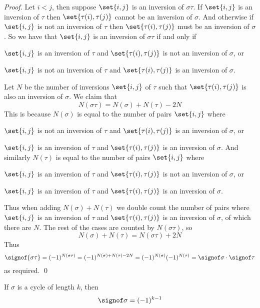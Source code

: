 \begin{proof}

    Let $i<j$, then suppose $\set{i,j}$ is an inversion of $\sigma\tau$.
    If $\set{i,j}$ is an inversion of $\tau$ then $\set{\tau(i),\tau(j)}$ cannot be an inversion of $\sigma$.
    And otherwise if $\set{i,j}$ is not an inversion of $\tau$ then $\set{\tau(i),\tau(j)}$ must be an inversion of $\sigma$.
    So we have that $\set{i,j}$ is an inversion of $\sigma\tau$ if and only if
    \blist
        \item $\set{i,j}$ is an inversion of $\tau$ and $\set{\tau(i),\tau(j)}$ is not an inversion of $\sigma$, or
        \item $\set{i,j}$ is not an inversion of $\tau$ and $\set{\tau(i),\tau(j)}$ is an inversion of $\sigma$.
    \elist

    Let $N$ be the number of inversions $\set{i,j}$ of $\tau$ such that $\set{\tau(i),\tau(j)}$ is also an inversion of $\sigma$.
    We claim that
    \[ N(\sigma\tau) = N(\sigma) + N(\tau) - 2N \]
    This is because $N(\sigma)$ is equal to the number of pairs $\set{i,j}$ where
    \blist
        \item $\set{i,j}$ is not an inversion of $\tau$ and $\set{\tau(i),\tau(j)}$ is an inversion of $\sigma$, or
        \item $\set{i,j}$ is an inversion of $\tau$ and $\set{\tau(i),\tau(j)}$ is an inversion of $\sigma$.
    \elist
    And similarly $N(\tau)$ is equal to the number of pairs $\set{i,j}$ where
    \blist
        \item $\set{i,j}$ is an inversion of $\tau$ and $\set{\tau(i),\tau(j)}$ is not an inversion of $\sigma$, or
        \item $\set{i,j}$ is an inversion of $\tau$ and $\set{\tau(i),\tau(j)}$ is an inversion of $\sigma$.
    \elist

    Thus when adding $N(\sigma)+N(\tau)$ we double count the number of pairs where $\set{i,j}$ is an inversion of $\tau$ and $\set{\tau(i),\tau(j)}$ is an inversion of $\sigma$, of which there are $N$.
    The rest of the cases are counted by $N(\sigma\tau)$, so
    \[ N(\sigma) + N(\tau) = N(\sigma\tau) + 2N \]
    Thus
    \[ \signof{\sigma\tau} = (-1)^{N(\sigma\tau)} = (-1)^{N(\sigma)+N(\tau)-2N} = (-1)^{N(\sigma)}(-1)^{N(\tau)} = \signof\sigma\cdot\signof\tau \]
    as required.
    \qed

\end{proof}

\begin{prop*}

    If $\sigma$ is a cycle of length $k$, then
    \[ \signof\sigma = (-1)^{k-1} \]

\end{prop*}

